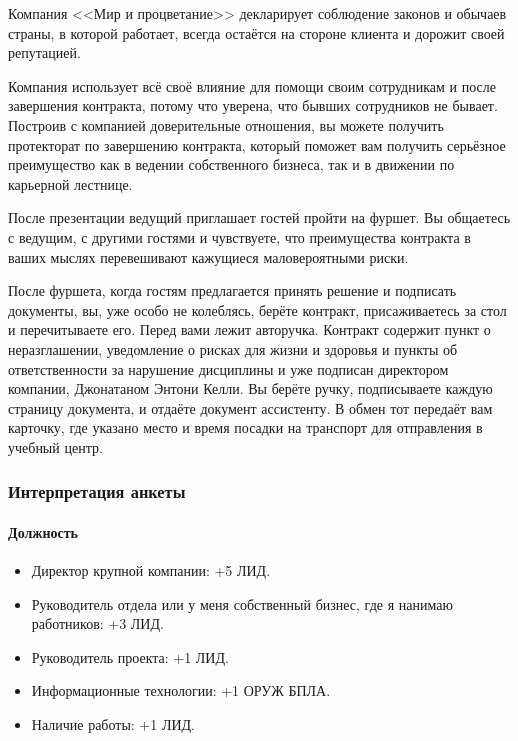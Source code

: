 \documentclass{article}
\begin{document}
Компания <<Мир и процветание>> декларирует соблюдение законов и обычаев
страны, в которой работает, всегда остаётся на стороне клиента и дорожит
своей репутацией.

Компания использует всё своё влияние для помощи своим сотрудникам и
после завершения контракта, потому что уверена, что бывших сотрудников
не бывает. Построив с компанией доверительные отношения, вы можете
получить протекторат по завершению контракта, который поможет вам
получить серьёзное преимущество как в ведении собственного бизнеса, так
и в движении по карьерной лестнице.

После презентации ведущий приглашает гостей пройти на фуршет. Вы
общаетесь с ведущим, с другими гостями и чувствуете, что преимущества
контракта в ваших мыслях перевешивают кажущиеся маловероятными риски.

После фуршета, когда гостям предлагается принять решение и подписать
документы, вы, уже особо не колеблясь, берёте контракт, присаживаетесь
за стол и перечитываете его. Перед вами лежит авторучка. Контракт
содержит пункт о неразглашении, уведомление о рисках для жизни и
здоровья и пункты об ответственности за нарушение дисциплины и уже
подписан директором компании, Джонатаном Энтони Келли. Вы берёте ручку,
подписываете каждую страницу документа, и отдаёте документ ассистенту. В
обмен тот передаёт вам карточку, где указано место и время посадки на
транспорт для отправления в учебный центр.

\subsubsection{Интерпретация
анкеты}\label{questionnaire-interpretation}

\paragraph{Должность}\label{position}

\begin{itemize}
\item
  Директор крупной компании: +5 ЛИД.
\item
  Руководитель отдела или у меня собственный бизнес, где я нанимаю
  работников: +3 ЛИД.
\item
  Руководитель проекта: +1 ЛИД.
\item
  Информационные технологии: +1 ОРУЖ БПЛА.
\item
  Наличие работы: +1 ЛИД.
\end{itemize}
\end{document}
